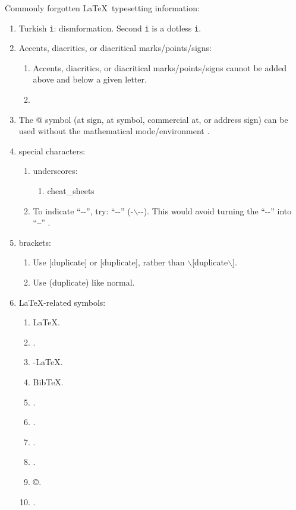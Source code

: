 Commonly forgotten \LaTeX\ typesetting information: \vspace{-0.3cm}
\begin{enumerate} \itemsep -4pt
\item Turkish {\tt i}: dis{\i}nformation. Second {\tt i} is a dotless {\tt i}.
\item Accents, diacritics, or diacritical marks/points/signs: \vspace{-0.3cm}
	\begin{enumerate} \itemsep -2pt
	\item Accents, diacritics, or diacritical marks/points/signs cannot be added above and below a given letter.
	\item \textcrd
	\end{enumerate}
\item The @ symbol (at sign, at symbol, commercial at, or address sign) can be used without the mathematical mode/environment \cite{Kopka2004}.
\item special characters: \vspace{-0.3cm}
	\begin{enumerate} \itemsep -2pt
	\item underscores: \vspace{-0.2cm}
		\begin{enumerate} \itemsep -2pt
		\item cheat\_sheets
		\end{enumerate}
	\item To indicate ``-\--'', try: ``-\--'' (-$\backslash$-\--). This would avoid turning the ``-\--'' into ``--'' \cite[\S2.5.3, pp. 26--27]{Kopka2004}.
	\end{enumerate}
\item brackets: \vspace{-0.3cm}
	\begin{enumerate} \itemsep -2pt
	\item Use $[$duplicate$]$ or [duplicate], rather than $\backslash$[duplicate$\backslash$]. %
	\item Use (duplicate) like normal.
	\end{enumerate}
\item LaTeX-related symbols: \vspace{-0.3cm}
	\begin{enumerate} \itemsep -2pt
	\item \LaTeX.
	\item \LaTeXe.
	\item \AmS-\LaTeX.
	\item {\sc Bib}\TeX.
	\item \MF.
	\item \MP.
	\item \texttrademark.
	\item \textregistered.
	\item \copyright.
	\item \textcopyleft.
	\end{enumerate}
\end{enumerate}





